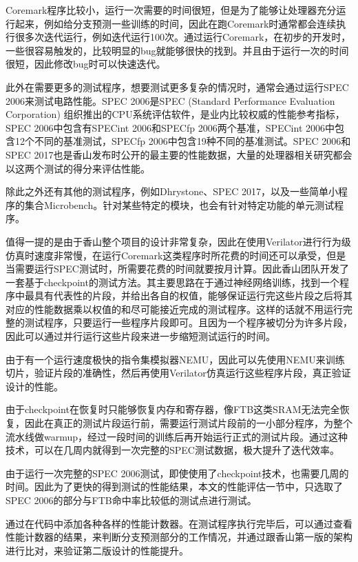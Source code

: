 Coremark程序比较小，运行一次需要的时间很短，但是为了能够让处理器充分运行起来，例如给分支预测一些训练的时间，因此在跑Coremark时通常都会连续执行很多次迭代运行，例如迭代运行100次。通过运行Coremark，在初步的开发时，一些很容易触发的，比较明显的bug就能够很快的找到。并且由于运行一次的时间很短，因此修改bug时可以快速迭代。

此外在需要更多的测试程序，想要测试更多复杂的情况时，通常会通过运行SPEC 2006\cite{spec-2006}来测试电路性能。SPEC 2006是SPEC (Standard Performance Evaluation Corporation) 组织推出的CPU系统评估软件，是业内比较权威的性能参考指标，SPEC 2006中包含有SPECint 2006和SPECfp 2006两个基准，SPECint 2006中包含12个不同的基准测试，SPECfp 2006中包含19种不同的基准测试。SPEC 2006和SPEC 2017也是香山发布时公开的最主要的性能数据，大量的处理器相关研究都会以这两个测试的得分来评估性能。

除此之外还有其他的测试程序，例如Dhrystone\cite{dhrystone}、SPEC 2017，以及一些简单小程序的集合Microbench。针对某些特定的模块，也会有针对特定功能的单元测试程序。


值得一提的是由于香山整个项目的设计非常复杂，因此在使用Verilator进行行为级仿真时速度非常慢，在运行Coremark这类程序时所花费的时间还可以承受，但是当需要运行SPEC测试时，所需要花费的时间就要按月计算。因此香山团队开发了一套基于checkpoint的测试方法。其主要思路在于通过神经网络训练，找到一个程序中最具有代表性的片段，并给出各自的权值，能够保证运行完这些片段之后将其对应的性能数据乘以权值的和尽可能接近完成的测试程序。这样的话就不用运行完整的测试程序，只要运行一些程序片段即可。且因为一个程序被切分为许多片段，因此可以通过并行运行这些片段来进一步缩短测试运行的时间。

由于有一个运行速度极快的指令集模拟器NEMU，因此可以先使用NEMU来训练切片，验证片段的准确性，然后再使用Verilator仿真运行这些程序片段，真正验证设计的性能。

由于checkpoint在恢复时只能够恢复内存和寄存器，像FTB这类SRAM无法完全恢复，因此在真正的测试片段运行前，需要运行测试片段前的一小部分程序，为整个流水线做warmup，经过一段时间的训练后再开始运行正式的测试片段。通过这种技术，可以在几周内就得到一次完整的SPEC测试数据，极大提升了迭代效率。

由于运行一次完整的SPEC 2006测试，即使使用了checkpoint技术，也需要几周的时间。因此为了更快的得到测试的性能结果，本文的性能评估一节中，只选取了SPEC 2006的部分与FTB命中率比较低的测试点进行测试。

通过在代码中添加各种各样的性能计数器。在测试程序执行完毕后，可以通过查看性能计数器的结果，来判断分支预测部分的工作情况，并通过跟香山第一版的架构进行比对，来验证第二版设计的性能提升。

